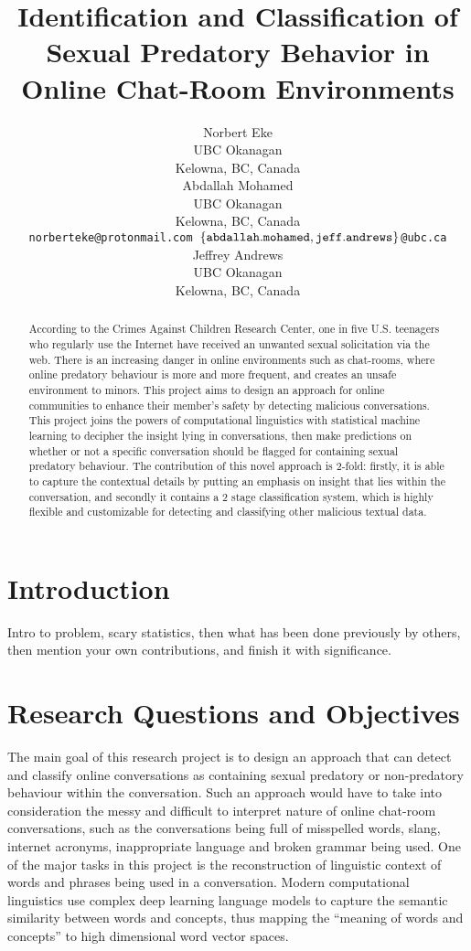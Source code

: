 \documentclass[11pt]{article}
\title{Identification and Classification of Sexual Predatory Behavior in Online Chat-Room Environments}
\author{Norbert Eke \\
  UBC Okanagan \\
  Kelowna, BC, Canada \\
 \And
  Abdallah Mohamed \\
  UBC Okanagan \\
  Kelowna, BC, Canada \\
  {\tt norberteke@protonmail.com \tab  $\left\{\tt abdallah.mohamed, jeff.andrews \right\}$\tt @ubc.ca} \\
  \And
  Jeffrey Andrews \\
  UBC Okanagan \\
  Kelowna, BC, Canada \\
 }
\date{}
\begin{document}
\maketitle

\begin{abstract} According to the Crimes Against Children Research Center, one in five U.S. teenagers who regularly use the Internet have received an unwanted sexual solicitation via the web. There is an increasing danger in online environments such as chat-rooms, where online predatory behaviour is more and more frequent, and creates an unsafe environment to minors. 
This project aims to design an approach for online communities to enhance their member’s safety by detecting malicious conversations. This project joins the powers of computational linguistics with statistical machine learning to decipher the insight lying in conversations, then make predictions on whether or not a specific conversation should be flagged for containing sexual predatory behaviour. 
The contribution of this novel approach is 2-fold: firstly, it is able to capture the contextual details by putting an emphasis on insight that lies within the conversation, and secondly it contains a 2 stage classification system, which is highly flexible and customizable for detecting and classifying other malicious textual data. 
\end{abstract}

\section{Introduction}
Intro to problem, scary statistics, then what has been done previously by others, then mention your own contributions, and finish it with significance.

\section{Research Questions and Objectives}
\indent The main goal of this research project is to design an approach that can detect and classify online conversations as containing sexual predatory or non-predatory behaviour within the conversation. Such an approach would have to take into consideration the messy and difficult to interpret nature of online chat-room conversations, such as the conversations being full of misspelled words, slang, internet acronyms, inappropriate language and broken grammar being used. One of the major tasks in this project is the reconstruction of linguistic context of words and phrases being used in a conversation. Modern computational linguistics use complex deep learning language models to capture the semantic similarity between words and concepts, thus mapping the “meaning of words and concepts” to high dimensional word vector spaces. 
\end{document}
